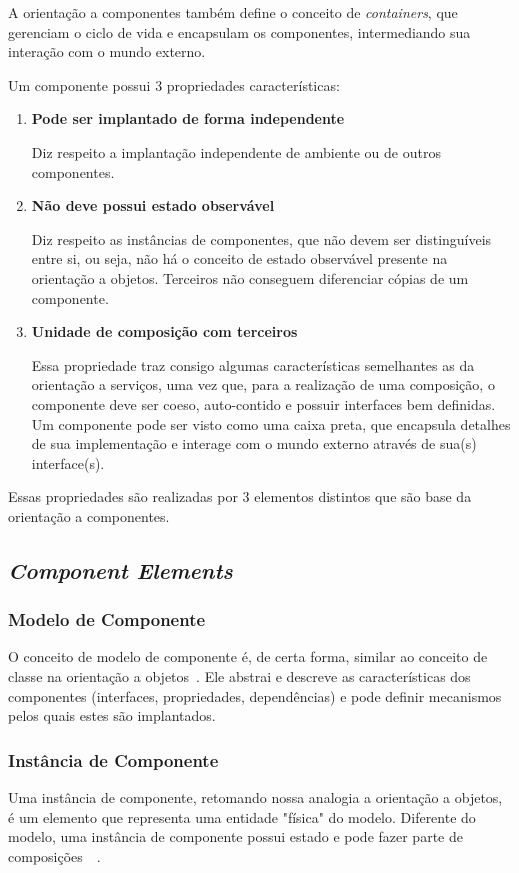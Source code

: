 A orientação a componentes também define o conceito de \textit{containers}, que gerenciam o ciclo de vida e encapsulam os componentes, intermediando sua interação com o mundo externo.

Um componente possui 3 propriedades características:

\begin{enumerate}
\item \textbf{Pode ser implantado de forma independente}

Diz respeito a implantação independente de ambiente ou de outros componentes.

\item \textbf{Não deve possui estado observável}

Diz respeito as instâncias de componentes, que não devem ser distinguíveis entre si, ou seja, não há o conceito de estado observável presente na orientação a objetos. Terceiros não conseguem diferenciar cópias de um componente.

\item \textbf{Unidade de composição com terceiros}

Essa propriedade traz consigo algumas características semelhantes as da orientação a serviços, uma vez que, para a realização de uma composição, o componente deve ser coeso, auto-contido e possuir interfaces bem definidas. 
Um componente pode ser visto como uma caixa preta, que encapsula detalhes de sua implementação e interage com o mundo externo através de sua(s) interface(s).
\end{enumerate}

Essas propriedades são realizadas por 3 elementos distintos que são base da orientação a componentes.

\subsection{\textit{Component Elements}}
\label{sub:elements}

\subsubsection{Modelo de Componente}
O conceito de modelo de componente é, de certa forma, similar ao conceito de classe na orientação a objetos~\cite{cervantes2005technical}. Ele abstrai e descreve as características dos componentes (interfaces, propriedades, dependências) e pode definir mecanismos pelos quais estes são implantados.

\subsubsection{Instância de Componente}
Uma instância de componente, retomando nossa analogia a orientação a objetos, é um elemento que representa uma entidade "física" do modelo. Diferente do modelo, uma instância de componente possui estado e pode fazer parte de composições~\cite{cervantes2005technical}~\cite{szyperski2002component}.

